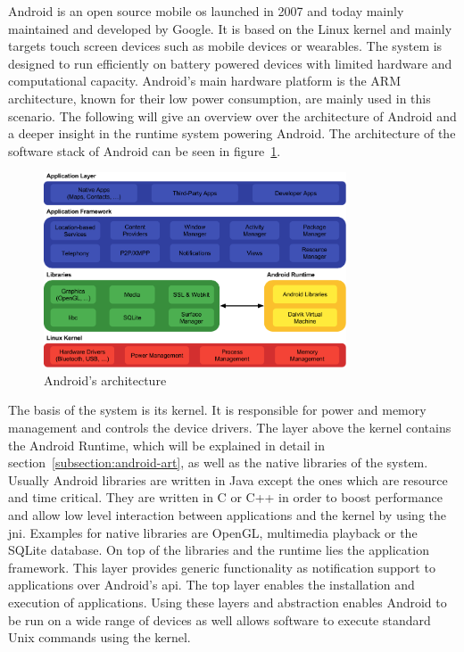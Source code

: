 Android is an open source mobile \gls{os} launched in 2007 and today mainly maintained and developed by Google.
It is based on the Linux kernel and mainly targets touch screen devices such as mobile devices or wearables.
The system is designed to run efficiently on battery powered devices with limited hardware and computational capacity.
Android's main hardware platform is the ARM architecture, known for their low power consumption, are mainly used in this scenario.
The following will give an overview over the architecture of Android and a deeper insight in the runtime system powering Android.
The architecture of the software stack of Android can be seen in figure~\ref{fig:androidArchitecture}.
\newline

\begin{figure}[h]
    \centering
    \includegraphics[width=0.8\textwidth]{data/stack.png}
    \caption{Android's architecture \cite{androidStack}}
    \label{fig:androidArchitecture}
\end{figure}

The basis of the system is its kernel.
It is responsible for power and memory management and controls the device drivers.
\newline
The layer above the kernel contains the Android Runtime, which will be explained in detail in section~\ref{subsection:android-art}, as well as the native libraries of the system.
Usually Android libraries are written in Java except the ones which are resource and time critical.
They are written in C or C++ in order to boost performance and allow low level interaction between applications and the kernel by using the \gls{jni}.
Examples for native libraries are OpenGL, multimedia playback or the SQLite database.
\newline
On top of the libraries and the runtime lies the application framework.
This layer provides generic functionality as notification support to applications over Android's \gls{api}.
\newline
The top layer enables the installation and execution of applications.
\newline
Using these layers and abstraction enables Android to be run on a wide range of devices as well allows software to execute standard Unix commands using the kernel.
